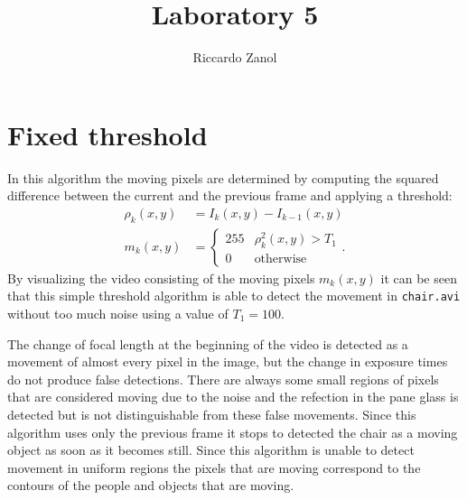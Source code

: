 \documentclass[a4paper,oneside]{article}
\author{Riccardo Zanol}
\title{Laboratory 5}
\newcommand{\inlinecode}[1]{\lstinline[basicstyle=\ttfamily,keywordstyle={},stringstyle={},commentstyle={\itshape}]{#1}}
\begin{document}
\maketitle
\section*{Fixed threshold}
In this algorithm the moving pixels are determined by computing the
squared difference between the current and the previous frame and
applying a threshold:
\begin{align}
  \rho_k(x,y) &= I_k(x,y) - I_{k-1}(x,y) \\
  m_k(x,y) &= \begin{cases}
    255 & \rho_k^2(x,y) > T_1 \\
    0 & \text{otherwise}
    \end{cases} .
\end{align}
By visualizing the video consisting of the moving pixels $m_k(x,y)$ it
can be seen that this simple threshold algorithm is able to detect the
movement in \inlinecode{chair.avi} without too much noise using a
value of $T_1 = 100$.

The change of focal length at the beginning of the video is detected
as a movement of almost every pixel in the image, but the change in
exposure times do not produce false detections. There are always some
small regions of pixels that are considered moving due to the noise
and the refection in the pane glass is detected but is not
distinguishable from these false movements.  Since this algorithm uses
only the previous frame it stops to detected the chair as a moving
object as soon as it becomes still.  Since this algorithm is unable to
detect movement in uniform regions the pixels that are moving
correspond to the contours of the people and objects that are moving.
\end{document}
